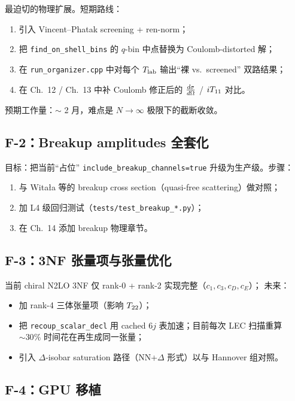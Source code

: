 最迫切的物理扩展。短期路线：
\begin{enumerate}
  \item 引入 Vincent--Phatak screening + ren-norm；
  \item 把 \texttt{find\_on\_shell\_bins} 的 \(q\)-bin 中点替换为 Coulomb-distorted 解；
  \item 在 \texttt{run\_organizer.cpp} 中对每个 \({T_{\text{lab}}}\) 输出“裸 vs.~screened” 双路结果；
  \item 在 Ch.~12 / Ch.~13 中补 Coulomb 修正后的 \(\frac{d\sigma}{d\Omega}\) / \({i T_{11}}\) 对比。
\end{enumerate}
预期工作量：\(\sim\) 2 月，难点是 \(N\to\infty\) 极限下的截断收敛。

\subsection{F-2：Breakup amplitudes 全套化}

目标：把当前“占位” \texttt{include\_breakup\_channels=true} 升级为生产级。步骤：
\begin{enumerate}
  \item 与 Witała 等的 breakup cross section（quasi-free scattering）做对照；
  \item 加 L4 级回归测试（\texttt{tests/test\_breakup\_*.py}）；
  \item 在 Ch.~14 添加 breakup 物理章节。
\end{enumerate}

\subsection{F-3：3NF 张量项与张量优化}

当前 chiral N2LO 3NF 仅 rank-0 + rank-2 实现完整（\(c_1,c_3,c_D,c_E\)）；
未来：
\begin{itemize}
  \item 加 rank-4 三体张量项（影响 \({T_{22}}\)）；
  \item 把 \texttt{recoup\_scalar\_decl} 用 cached 6\(j\) 表加速；目前每次 LEC 扫描重算 \(\sim 30\%\) 时间花在再生成同一张量；
  \item 引入 \(\Delta\)-isobar saturation 路径（NN+\(\Delta\) 形式）以与 Hannover 组对照。
\end{itemize}

\subsection{F-4：GPU 移植}

